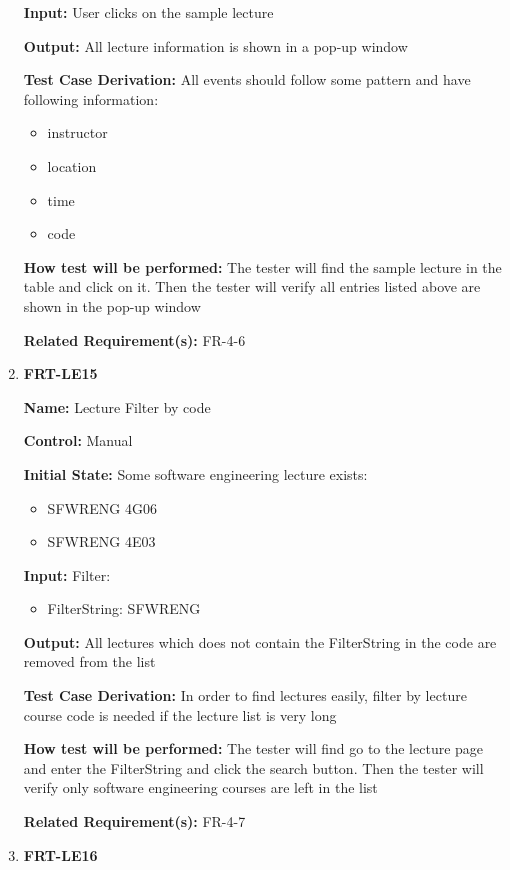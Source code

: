 \documentclass[12pt, titlepage]{article}
\begin{document}
\begin{enumerate}
\textbf{Input:} User clicks on the sample lecture
					
\textbf{Output:} All lecture information is shown in a pop-up window

\textbf{Test Case Derivation:} All events should follow some pattern and have following information:
\begin{itemize}
\item instructor
\item location
\item time
\item code
\end{itemize}
					
\textbf{How test will be performed:} The tester will find the sample lecture in the table and click on it. Then the tester will verify all entries listed above are shown in the pop-up window

\textbf{Related Requirement(s):} FR-4-6

\item{\textbf{FRT-LE15}}

\textbf{Name:} Lecture Filter by code

\textbf{Control:} Manual
					
\textbf{Initial State:} Some software engineering lecture exists:
\begin{itemize}
\item SFWRENG 4G06
\item SFWRENG 4E03
\end{itemize}

\textbf{Input:} Filter:
\begin{itemize}
\item FilterString: SFWRENG
\end{itemize}
					
\textbf{Output:} All lectures which does not contain the FilterString in the code are removed from the list

\textbf{Test Case Derivation:} In order to find lectures easily, filter by lecture course code is needed if the lecture list is very long
					
\textbf{How test will be performed:} The tester will find go to the lecture page and enter the FilterString and click the search button. Then the tester will verify only software engineering courses are left in the list

\textbf{Related Requirement(s):} FR-4-7

\item{\textbf{FRT-LE16}}


\end{enumerate}
\end{document}

